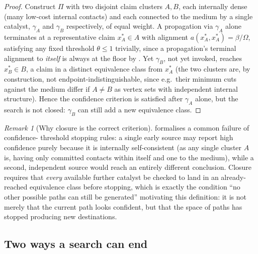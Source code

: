 \documentclass[11pt,twocolumn,a4paper]{article}
\theoremstyle{thmstyle}
\theoremstyle{definition}
\theoremstyle{remark}
\newtheorem{remark}[theorem]{Remark}
\newcommand{\flo}{\beta}
\newcommand{\Proc}{\Pi}
\begin{document}
\begin{proof}
Construct $\Proc$ with two disjoint claim clusters $A,B$, each internally
dense (many low-cost internal contacts) and each connected to the medium
by a single catalyst, $\gamma_A$ and $\gamma_B$ respectively, of equal
weight. A propagation via $\gamma_A$ alone terminates at a representative
claim $x^{\ast}_A\in A$ with alignment $a(x^{\ast}_A,x^{\ast}_A)=\flo/\Omega$,
satisfying any fixed threshold $\theta\le1$ trivially, since a
propagation's terminal alignment to \emph{itself} is always at the floor
by . Yet $\gamma_B$, not yet invoked, reaches
$x^{\ast}_B\in B$, a claim in a distinct equivalence class from
$x^{\ast}_A$ (the two clusters are, by construction, not
endpoint-indistinguishable, since e.g.\ their minimum cuts against the
medium differ if $A\neq B$ as vertex sets with independent internal
structure). Hence the confidence criterion is satisfied after $\gamma_A$
alone, but the search is not closed: $\gamma_B$ can still add a new
equivalence class.
\end{proof}

\begin{remark}[Why closure is the correct criterion]
\label{rem:closure-correct}
 formalises a common failure of confidence-
threshold stopping rules: a single early source may report high confidence
purely because it is internally self-consistent (as any single cluster
$A$ is, having only committed contacts within itself and one to the
medium), while a second, independent source would reach an entirely
different conclusion. Closure requires that \emph{every} available further
catalyst be checked to land in an already-reached equivalence class before
stopping, which is exactly the condition ``no other possible paths can
still be generated'' motivating this definition: it is not merely that the
current path looks confident, but that the space of paths has stopped
producing new destinations.
\end{remark}

\subsection{Two ways a search can end}
\end{document}
